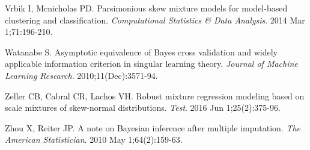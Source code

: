 \documentclass[useAMS,referee]{biom}
\begin{document}
\begin{thebibliography}{}
\bibitem{ } Vrbik I, Mcnicholas PD. Parsimonious skew mixture models for model-based clustering and classification. \textit{Computational Statistics \& Data Analysis}. 2014 Mar 1;71:196-210.

\bibitem{ } Watanabe S. Asymptotic equivalence of Bayes cross validation and widely applicable information criterion in singular learning theory. \textit{Journal of Machine Learning Research}. 2010;11(Dec):3571-94.

\bibitem{ } Zeller CB, Cabral CR, Lachos VH. Robust mixture regression modeling based on scale mixtures of skew-normal distributions. \textit{Test}. 2016 Jun 1;25(2):375-96.

\bibitem{ } Zhou X, Reiter JP. A note on Bayesian inference after multiple imputation. \textit{The American Statistician}. 2010 May 1;64(2):159-63.

\end{thebibliography}




\label{lastpage}
\end{document}

